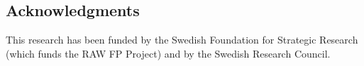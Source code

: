 \subsection*{Acknowledgments} 
This research has been funded by the Swedish Foundation for Strategic Research (which funds
the RAW FP Project) and
by the Swedish Research Council.








%

